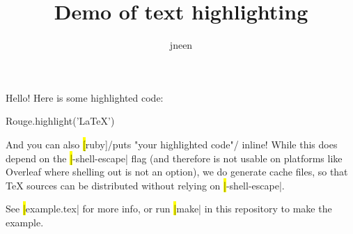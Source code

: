 \documentclass{article}
\begin{document}
\def\withcursor#1{\texttt{\textbf{%
  \fboxsep=0pt\colorbox{gray}{%
    \parbox[c][\height][c]{0.61em}{%
      \strut\textcolor{white}{#1}%
    }%
  }}%
}}
\def\cursormark{\withcursor{}}
\def\prompt{\textasciitilde>}

\title{Demo of text highlighting}
\author{jneen}

\maketitle

\noindent Hello! Here is some highlighted code:

\begin{hilite}[ruby]
Rouge.highlight('LaTeX')
\end{hilite}

\noindent And you can also \hl[ruby]/puts "your highlighted code"/ inline! While this does depend on the \hl|-shell-escape| flag (and therefore is not usable on platforms like Overleaf where shelling out is not an option), we do generate cache files, so that TeX sources can be distributed without relying on \hl|-shell-escape|.

See \hl|example.tex| for more info, or run \hl|make| in this repository to make the example.
\end{document}

